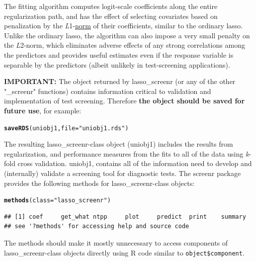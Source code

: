 \documentclass[11pt]{report}\usepackage[]{graphicx}\usepackage[]{xcolor}
\makeatletter
\newcommand{\hlstr}[1]{\textcolor[rgb]{0.192,0.494,0.8}{#1}}%
\newcommand{\hlstd}[1]{\textcolor[rgb]{0.345,0.345,0.345}{#1}}%
\newcommand{\hlkwc}[1]{\textcolor[rgb]{0.333,0.667,0.333}{#1}}%
\newcommand{\hlkwd}[1]{\textcolor[rgb]{0.737,0.353,0.396}{\textbf{#1}}}%
\newenvironment{kframe}{%
 \def\at@end@of@kframe{}%
 \ifinner\ifhmode%
  \def\at@end@of@kframe{\end{minipage}}%
  \begin{minipage}{\columnwidth}%
 \fi\fi%
 \def\FrameCommand##1{\hskip\@totalleftmargin \hskip-\fboxsep
 \colorbox{shadecolor}{##1}\hskip-\fboxsep
     \hskip-\linewidth \hskip-\@totalleftmargin \hskip\columnwidth}%
 \MakeFramed {\advance\hsize-\width
   \@totalleftmargin\z@ \linewidth\hsize
   \@setminipage}}%
 {\par\unskip\endMakeFramed%
 \at@end@of@kframe}
\newenvironment{knitrout}{}{} %
\makeatother
\begin{document}
The fitting algorithm computes logit-scale coefficients along the
entire regularization path, and has the effect of selecting covariates
based on penalization by the
\emph{L}1-\href{https://towardsdatascience.com/norms-penalties-and-multitask-learning-2f1db5f97c1f}{norm}
of their coefficients, similar to the ordinary
lasso\citep{Hastie+al2009}.  Unlike the ordinary lasso, the
algorithm can also impose a very small penalty on the \emph{L}2-norm,
which eliminates adverse effects of any strong correlations among the
predictors and provides useful estimates even if the response variable
is separable by the predictors (albeit unlikely in test-screening
applications).

\textbf{IMPORTANT:} The object returned by \textsf{lasso\_screenr} (or any of the other
\textsf{"\_screenr"} functions) contains information critical to validation and
implementation of test screening. Therefore \textbf{the object should be saved
for future use}, for example:
\begin{knitrout}
\color{fgcolor}\begin{kframe}
\begin{alltt}
\hlkwd{saveRDS}\hlstd{(uniobj1,} \hlkwc{file} \hlstd{=} \hlstr{"uniobj1.rds"} \hlstd{)}
\end{alltt}
\end{kframe}
\end{knitrout}

The resulting \textsf{lasso\_screenr}-class object (\textsf{uniobj1})
includes the results from regularization, and performance measures from
the fits to all of the data using \emph{k}-fold cross validation.
\textsf{uniobj1}, contains all of the information need to develop and
(internally) validate a screening tool for diagnostic tests. The
\textsf{screenr} package provides the following methods for
\textsf{lasso\_screenr}-class objects:
\begin{knitrout}
\color{fgcolor}\begin{kframe}
\begin{alltt}
\hlkwd{methods}\hlstd{(}\hlkwc{class} \hlstd{=} \hlstr{"lasso_screenr"}\hlstd{)}
\end{alltt}
\begin{verbatim}
## [1] coef     get_what ntpp     plot     predict  print    summary 
## see '?methods' for accessing help and source code
\end{verbatim}
\end{kframe}
\end{knitrout}
The methods should make it mostly unnecessary to access components of
\textsf{lasso\_screenr}-class objects directly using \textsf{R} code similar to
\verb|object$component|.
\end{document}
